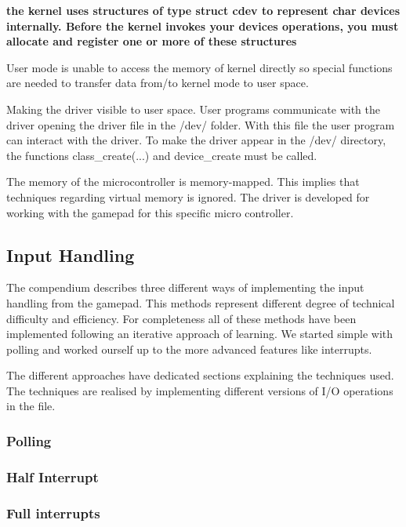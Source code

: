 {\bf the kernel uses structures of type struct cdev to represent char devices internally. Before the kernel invokes your devices operations, you must allocate and register one or more of these structures}


User mode is unable to access the memory of kernel directly so special functions are needed to transfer data from/to kernel mode to user space.





Making the driver visible to user space. User programs communicate with the driver opening the driver file in the /dev/ folder. With this file the user program can interact with the driver. To make the driver appear in the /dev/ directory, the functions class\_create(...) and device\_create must be called. 


The memory of the microcontroller is memory-mapped. This implies that techniques regarding virtual memory is ignored. The driver is developed for working with the gamepad for this specific micro controller. 

\subsection{Input Handling}
The compendium describes three different ways of implementing the input handling from the gamepad. This methods represent different degree of technical difficulty and efficiency. For completeness all of these methods have been implemented following an iterative approach of learning. We started simple with polling and worked ourself up to the more advanced features like interrupts.  

The different approaches have dedicated sections explaining the techniques used. The techniques are realised by implementing different versions of I/O operations in the file.  

\subsubsection{Polling}


\subsubsection{Half Interrupt}


\subsubsection{Full interrupts}

